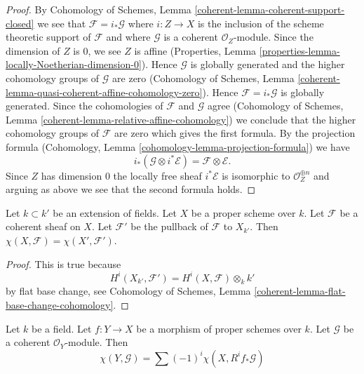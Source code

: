\begin{proof}
By Cohomology of Schemes, Lemma \ref{coherent-lemma-coherent-support-closed}
we see that $\mathcal{F} = i_*\mathcal{G}$ where $i : Z \to X$ is the inclusion
of the scheme theoretic support of $\mathcal{F}$ and where $\mathcal{G}$
is a coherent $\mathcal{O}_Z$-module. Since the dimension of $Z$ is
$0$, we see $Z$ is affine (Properties, Lemma
\ref{properties-lemma-locally-Noetherian-dimension-0}).
Hence $\mathcal{G}$ is globally generated and the higher
cohomology groups of $\mathcal{G}$ are zero
(Cohomology of Schemes, Lemma
\ref{coherent-lemma-quasi-coherent-affine-cohomology-zero}).
Hence $\mathcal{F} = i_*\mathcal{G}$ is globally generated.
Since the cohomologies of $\mathcal{F}$ and $\mathcal{G}$ agree
(Cohomology of Schemes, Lemma \ref{coherent-lemma-relative-affine-cohomology})
we conclude that the higher cohomology groups of $\mathcal{F}$ are zero
which gives the first formula. By the projection formula
(Cohomology, Lemma \ref{cohomology-lemma-projection-formula}) we have
$$
i_*(\mathcal{G} \otimes i^*\mathcal{E}) = \mathcal{F} \otimes \mathcal{E}.
$$
Since $Z$ has dimension $0$ the locally free sheaf $i^*\mathcal{E}$
is isomorphic to $\mathcal{O}_Z^{\oplus n}$ and arguing as above
we see that the second formula holds.
\end{proof}

\begin{lemma}
\label{lemma-euler-characteristic-extend-base-field}
Let $k \subset k'$ be an extension of fields. Let $X$ be a proper scheme
over $k$. Let $\mathcal{F}$ be a coherent sheaf on $X$.
Let $\mathcal{F}'$ be the pullback of $\mathcal{F}$ to $X_{k'}$.
Then $\chi(X, \mathcal{F}) = \chi(X', \mathcal{F}')$.
\end{lemma}

\begin{proof}
This is true because
$$
H^i(X_{k'}, \mathcal{F}') = H^i(X, \mathcal{F}) \otimes_k k'
$$
by flat base change, see
Cohomology of Schemes, Lemma \ref{coherent-lemma-flat-base-change-cohomology}.
\end{proof}

\begin{lemma}
\label{lemma-euler-characteristic-morphism}
Let $k$ be a field. Let $f : Y \to X$ be a morphism of proper schemes over
$k$. Let $\mathcal{G}$ be a coherent $\mathcal{O}_Y$-module. Then
$$
\chi(Y, \mathcal{G}) = \sum (-1)^i \chi(X, R^if_*\mathcal{G})
$$
\end{lemma}

